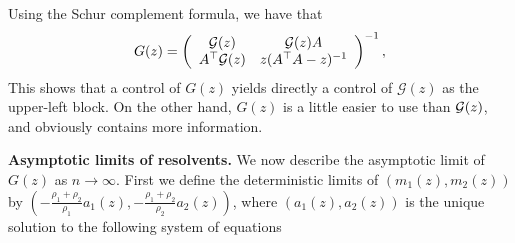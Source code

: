 Using the Schur complement formula, we have that %
 \begin{equation} \label{green2}
  G(z) =  \left( {\begin{array}{*{20}c}
   { \cal G (z)} & \cal G(z)A  \\
   A^\top \cal G(z) & z (A^\top A - z)^{-1}
\end{array}} \right)^{-1}, %
 \end{equation}
This shows that a control of $G(z)$ yields directly a control of $\mathcal G(z)$ as the upper-left block. On the other hand, $G(z)$ is a little  easier to use than $\cal G(z)$, and obviously contains more information.

\noindent\textbf{Asymptotic limits of resolvents.}
We now describe the asymptotic limit of $G(z)$ as $n\to \infty$. First we define the deterministic limits of $(m_1(z), m_{2}(z))$ by $\left(-\frac{\rho_1+\rho_2}{\rho_1}a_{1}(z),-\frac{\rho_1+\rho_2}{\rho_2}a_{2}(z)\right)$, where $(a_1(z), a_2(z))$ is
the unique solution to the following system of equations
